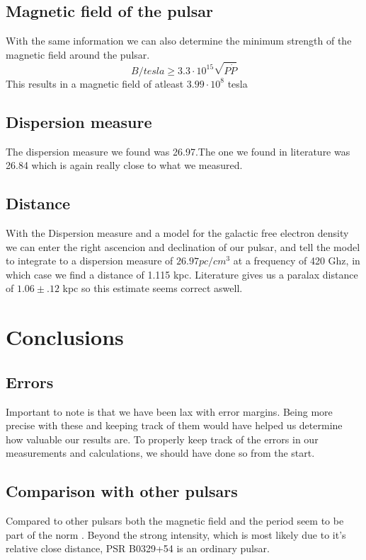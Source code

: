 \documentclass[twoside,twocolumn]{article}
\begin{document}
	\subsection{Magnetic field of the pulsar}
	With the same information we can also determine the minimum strength of the magnetic field around the pulsar.
	\begin{equation}
	B/tesla\ge 3.3\cdot { 10 }^{ 15 }\sqrt { P\dot { P }  } 
	\end{equation}
	This results in a magnetic field of atleast $3.99\cdot{10}^{8}$ tesla
	
	\subsection{Dispersion measure}
	The dispersion measure we found was 26.97.The one we found in literature was 26.84 \cite{Wang} which is again really close to what we measured. 
	
	\subsection{Distance}
	With the Dispersion measure and a model for the galactic free electron density we can enter the right ascencion and declination of our pulsar, and tell the model to integrate to a dispersion measure of $26.97 pc/{cm}^{3}$ at a frequency of 420 Ghz, in which case we find a distance of 1.115 kpc. Literature\cite{Wang} gives us a paralax distance of $1.06\pm.12$ kpc so this estimate seems correct aswell.
		

	\section{Conclusions}
	\subsection{Errors}
	Important to note is that we have been lax with error margins. Being more precise with these and keeping track of them would have helped us determine how valuable our results are. To properly keep track of the errors in our measurements and calculations, we should have done so from the start. 

	\subsection{Comparison with other pulsars}
	Compared to other pulsars both the magnetic field and the period seem to be part of the norm \cite{Burke}. Beyond the strong intensity, which is most likely due to it's relative close distance, PSR B0329+54 is an ordinary pulsar.
\end{document}
